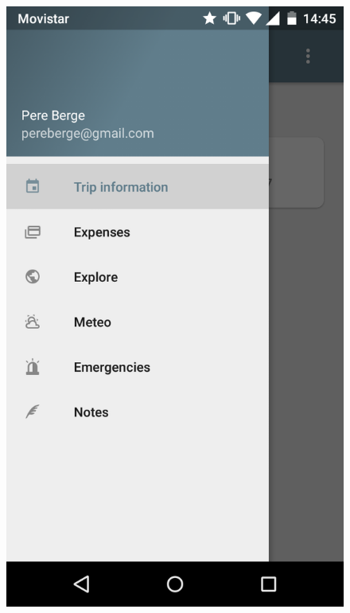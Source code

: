 \begin{itemize}
\clearpage

\begin{figure}[!h]
\centering
\includegraphics[scale=0.15]{Figures/Drawer.png}

\end{figure}
\end{itemize}
